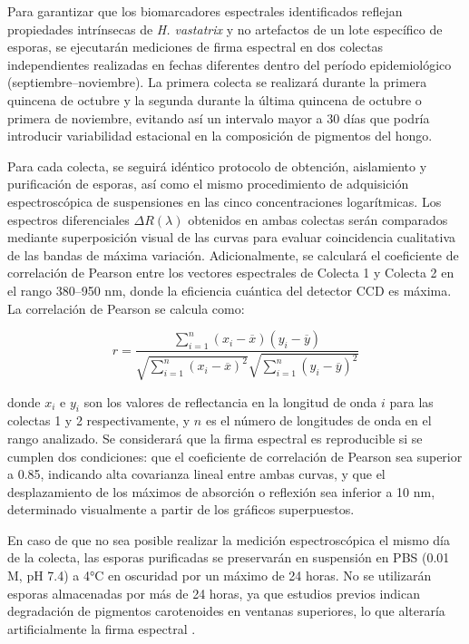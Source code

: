 \documentclass[12pt, a4paper]{article}
\begin{document}
	Para garantizar que los biomarcadores espectrales identificados reflejan propiedades intrínsecas de \textit{H. vastatrix} y no artefactos de un lote específico de esporas, se ejecutarán mediciones de firma espectral en dos colectas independientes realizadas en fechas diferentes dentro del período epidemiológico (septiembre--noviembre). La primera colecta se realizará durante la primera quincena de octubre y la segunda durante la última quincena de octubre o primera de noviembre, evitando así un intervalo mayor a 30 días que podría introducir variabilidad estacional en la composición de pigmentos del hongo.
	
	Para cada colecta, se seguirá idéntico protocolo de obtención, aislamiento y purificación de esporas, así como el mismo procedimiento de adquisición espectroscópica de suspensiones en las cinco concentraciones logarítmicas. Los espectros diferenciales $\Delta R(\lambda)$ obtenidos en ambas colectas serán comparados mediante superposición visual de las curvas para evaluar coincidencia cualitativa de las bandas de máxima variación. Adicionalmente, se calculará el coeficiente de correlación de Pearson entre los vectores espectrales de Colecta 1 y Colecta 2 en el rango 380--950 nm, donde la eficiencia cuántica del detector CCD es máxima. La correlación de Pearson se calcula como:
	
	\begin{equation}
		r = \frac{\sum_{i=1}^{n} (x_i - \overline{x})(y_i - \overline{y})}{\sqrt{\sum_{i=1}^{n} (x_i - \overline{x})^2} \sqrt{\sum_{i=1}^{n} (y_i - \overline{y})^2}}
	\end{equation}
	
	donde $x_i$ e $y_i$ son los valores de reflectancia en la longitud de onda $i$ para las colectas 1 y 2 respectivamente, y $n$ es el número de longitudes de onda en el rango analizado. Se considerará que la firma espectral es reproducible si se cumplen dos condiciones: que el coeficiente de correlación de Pearson sea superior a 0.85, indicando alta covarianza lineal entre ambas curvas, y que el desplazamiento de los máximos de absorción o reflexión sea inferior a 10 nm, determinado visualmente a partir de los gráficos superpuestos.
	
	En caso de que no sea posible realizar la medición espectroscópica el mismo día de la colecta, las esporas purificadas se preservarán en suspensión en PBS (0.01 M, pH 7.4) a 4°C en oscuridad por un máximo de 24 horas. No se utilizarán esporas almacenadas por más de 24 horas, ya que estudios previos indican degradación de pigmentos carotenoides en ventanas superiores, lo que alteraría artificialmente la firma espectral \parencite{Talhinhas2017}.
	
\end{document}
